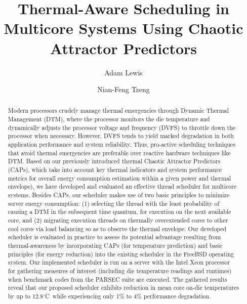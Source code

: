\documentclass[times, 10pt,twocolumn]{IEEEtran}
\begin{document}
\title{Thermal-Aware Scheduling in  Multicore Systems Using Chaotic
  Attractor Predictors} 
\author{Adam  Lewis} 
\author{Nian-Feng Tzeng} 
\date{}
\maketitle  
\newtheorem{defn}{Definition}
\newtheorem{thm}{Theorem}
\thispagestyle{empty}
\begin{abstract}
  Modern processors crudely manage thermal emergencies through Dynamic
  Thermal Management (DTM), where the processor monitors the die
  temperature and dynamically adjusts the processor voltage and
  frequency (DVFS) to throttle down the processor when
  necessary. However, DVFS tends to yield marked degradation in both
  application performance and system reliability. Thus, pro-active
  scheduling techniques that avoid thermal emergencies are preferable
  over reactive hardware techniques like DTM.  Based on our previously
  introduced thermal Chaotic Attractor Predictors (CAPs), which take into
  account key thermal indicators and system performance metrics for
  overall energy consumption estimation within a given power and thermal
  envelope), we have developed and evaluated an effective thread
  scheduler for multicore systems.  Besides CAPs, our scheduler makes
  use of two basic principles to minimize server energy consumption: (1)
  selecting the thread with the least probability of causing a DTM in
  the subsequent time quantum, for execution on the next available core,
  and (2) migrating execution threads on thermally overextended cores to
  other cool cores via load balancing so as to observe the thermal
  envelope.  Our developed scheduler is evaluated in practice to assess
  its potential advantage resulting from thermal-awareness by
  incorporating CAPs (for temperature prediction) and basic principles
  (for energy reduction) into the existing scheduler in the FreeBSD
  operating system.  Our implemented scheduler is run on a server with
  the Intel Xeon processor for gathering measures of interest (including
  die temperature readings and runtimes) when benchmark codes
  from the PARSEC suite are executed.  The gathered
  results reveal that our proposed scheduler exhibits reduction in mean
  core on-die temperatures by up to 12.8$^{\circ}$C\ while experiencing
  only 1\% to 4\% performance degradation.
\end{abstract}
\end{document}
